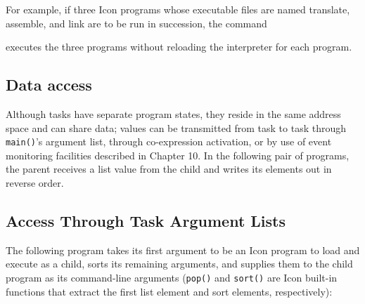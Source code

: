 
For example, if three Icon programs whose executable files are named
translate, assemble, and link are to be run in succession, the command 


\noindent
executes the three programs without reloading the interpreter for each
program. 

\subsection*{Data access}

Although tasks have separate program states, they reside in the same
address space and can share data; values can be transmitted from task
to task through {\texttt{main()}}'s argument list, through
co-expression activation, or by use of event monitoring facilities
described in Chapter 10. In the following pair of programs, the
parent receives a list value from the child and writes its elements
out in reverse order.



\subsection*{Access Through Task Argument Lists}

The following program takes its first argument to be an Icon program
to load and execute as a child, sorts its remaining arguments, and
supplies them to the child program as its command-line arguments
({\tt pop()} and {\tt sort()} are Icon built-in functions that extract
the first list element and sort elements, respectively):

